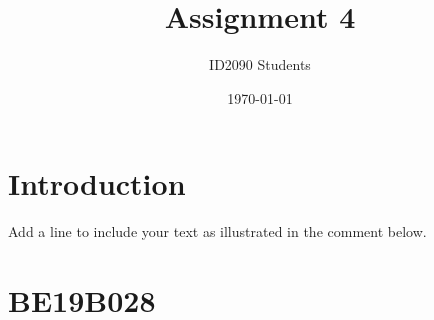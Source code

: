 \documentclass[a4paper, 12pt]{article}
\begin{document}
\title{Assignment 4}
\author{ID2090 Students}
\date{\today}
\maketitle

\tableofcontents


\section{Introduction}
Add a line to include your text as illustrated in the comment below.

 
 
 
 
\section{BE19B028} 


 

 
\end{document}
